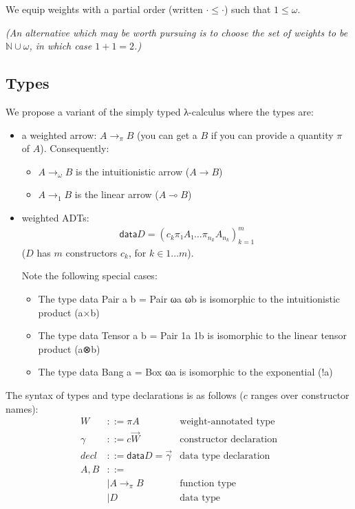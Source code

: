 \documentclass[11pt]{article}
\begin{document}
We equip weights with a partial order (written \(· ≤ ·\)) such that \(1 ≤ ω\).

\emph{(An alternative which may be worth pursuing is to choose the set of
weights to be \(ℕ∪{ω}\), in which case \(1+1=2\).)}

\subsection{Types}
\label{sec:orgheadline2}

We propose a variant of the simply typed λ-calculus where the types
are:

\begin{itemize}
\item a weighted arrow: \(A →_π B\) (you can get a \(B\) if you can provide a
quantity \(π\) of \(A\)). Consequently:
\begin{itemize}
\item \(A →_ω B\) is the intuitionistic arrow (\(A → B\))
\item \(A →_1 B\) is the linear arrow (\(A ⊸ B\))
\end{itemize}
\item weighted ADTs:
\begin{align*}
\mathsf{data} D = \left(c_k  π₁ A₁  …  π_{n_k} A_{n_k}\right)^m_{k=1}
\end{align*}
(\(D\) has \(m\) constructors \(c_k\), for \(k ∈ 1…m\)).

Note the following special cases:
\begin{itemize}
\item The type data Pair a b = Pair ωa ωb is isomorphic to the intuitionistic product (a×b)
\item The type data Tensor a b = Pair 1a 1b is isomorphic to the linear tensor product (a⊗b)
\item The type data Bang a = Box ωa is isomorphic to the exponential (!a)
\end{itemize}
\end{itemize}

The syntax of types and type declarations is as follows ($c$ ranges over constructor names):
\begin{align*}
  W &::= πA &\text{weight-annotated type}\\
  γ &::= c  \vec{W}&\text{constructor declaration}\\
  decl &::= \mathsf{data } D = \vec{γ}&\text{data type declaration}\\
  A,B &::=\\
      & |  A →_π B &\text{function type}\\
      & |  D &\text{data type}
\end{align*}
\end{document}

